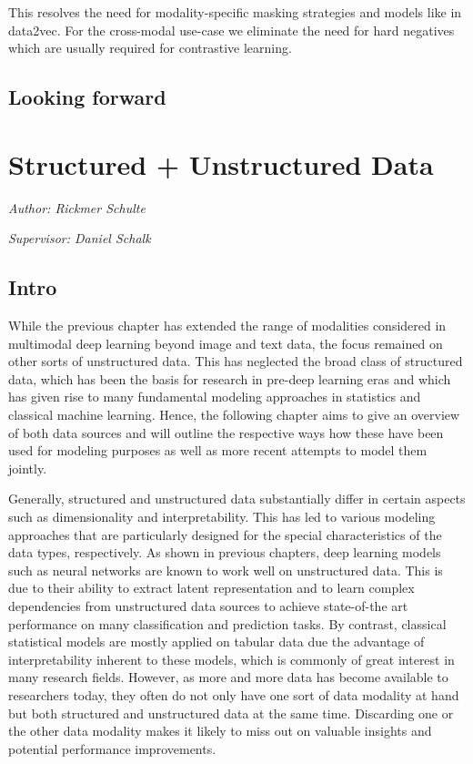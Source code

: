 \documentclass[
]{krantz}
\begin{document}
This resolves the need for modality-specific masking strategies and models like in data2vec. For the cross-modal use-case we eliminate the need for hard negatives which are usually required for contrastive learning.

\hypertarget{looking-forward}{%
\subsection{Looking forward}\label{looking-forward}}

\hypertarget{c03-02-structured-unstructured}{%
\section{Structured + Unstructured Data}\label{c03-02-structured-unstructured}}

\emph{Author: Rickmer Schulte}

\emph{Supervisor: Daniel Schalk}

\hypertarget{intro}{%
\subsection{Intro}\label{intro}}

While the previous chapter has extended the range of modalities considered in multimodal deep learning beyond image and text data, the focus remained on other sorts of unstructured data. This has neglected the broad class of structured data, which has been the basis for research in pre-deep learning eras and which has given rise to many fundamental modeling approaches in statistics and classical machine learning. Hence, the following chapter aims to give an overview of both data sources and will outline the respective ways how these have been used for modeling purposes as well as more recent attempts to model them jointly.

Generally, structured and unstructured data substantially differ in certain aspects such as dimensionality and interpretability. This has led to various modeling approaches that are particularly designed for the special characteristics of the data types, respectively. As shown in previous chapters, deep learning models such as neural networks are known to work well on unstructured data. This is due to their ability to extract latent representation and to learn complex dependencies from unstructured data sources to achieve state-of-the art performance on many classification and prediction tasks. By contrast, classical statistical models are mostly applied on tabular data due the advantage of interpretability inherent to these models, which is commonly of great interest in many research fields. However, as more and more data has become available to researchers today, they often do not only have one sort of data modality at hand but both structured and unstructured data at the same time. Discarding one or the other data modality makes it likely to miss out on valuable insights and potential performance improvements.
\end{document}
